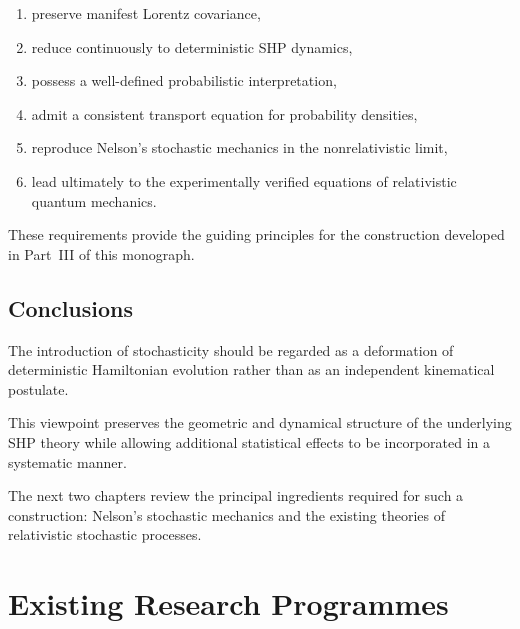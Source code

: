 \begin{enumerate}

\item preserve manifest Lorentz covariance,

\item reduce continuously to deterministic SHP dynamics,

\item possess a well-defined probabilistic interpretation,

\item admit a consistent transport equation for probability densities,

\item reproduce Nelson's stochastic mechanics in the
nonrelativistic limit,

\item lead ultimately to the experimentally verified equations of
relativistic quantum mechanics.

\end{enumerate}

These requirements provide the guiding principles for the construction
developed in Part~III of this monograph.

\subsection{Conclusions}

The introduction of stochasticity should be regarded as a deformation of
deterministic Hamiltonian evolution rather than as an independent
kinematical postulate.

This viewpoint preserves the geometric and dynamical structure of the
underlying SHP theory while allowing additional statistical effects to
be incorporated in a systematic manner.

The next two chapters review the principal ingredients required for such
a construction: Nelson's stochastic mechanics and the existing theories
of relativistic stochastic processes.


\section{Existing Research Programmes}

